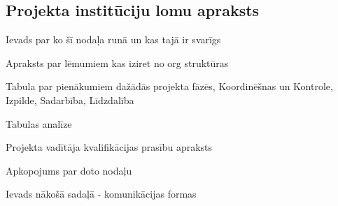 \subsection{Projekta institūciju lomu apraksts}
Ievads par ko šī nodaļa runā un kas tajā ir svarīgs
\par
Apraksts par lēmumiem kas iziret no org struktūras
\par
Tabula par pienākumiem dažādās projekta fāzēs,
Koordinēšnas un Kontrole, Izpilde, Sadarbība, Līdzdalība
\par
Tabulas analīze
\par
Projekta vadītāja kvalifikācijas prasību apraksts
\par
Apkopojums par doto nodaļu
\par
Ievads nākošā sadaļā - komunikācijas formas
